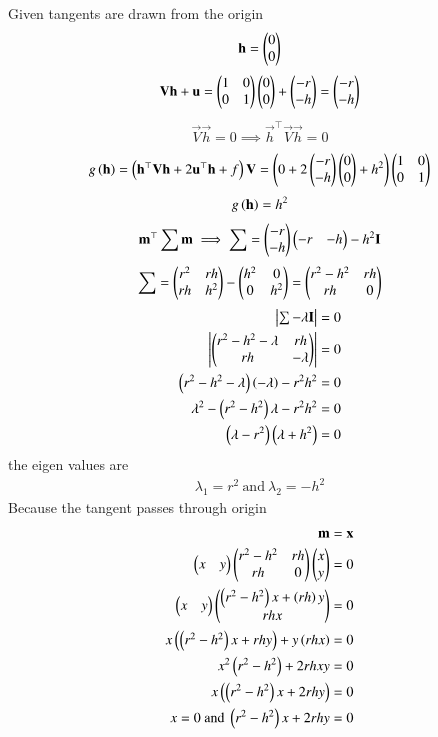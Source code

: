 \documentclass[journal]{IEEEtran}
\begin{document}
Given tangents are drawn from the origin
\begin{align}
    \mathbf{h}=\begin{pmatrix}0\\0\end{pmatrix}
\end{align}
\begin{align}
  \mathbf{V}\mathbf{h}+\mathbf{u}=\begin{pmatrix}1&0\\0&1\end{pmatrix}\begin{pmatrix}0\\0\end{pmatrix}+\begin{pmatrix}-r\\-h\end{pmatrix}=\begin{pmatrix}-r\\-h\end{pmatrix}
  \end{align}
  \begin{align}
   \vec{V}\vec{h}=0 \implies  \vec{h}^\top\vec{V}\vec{h}=0
   \end{align}
   \begin{align}
  g\left(\mathbf{h}\right)=\left(\mathbf{h}^{\top}\mathbf{V}\mathbf{h}+2\mathbf{u}^{\top}\mathbf{h} + f\right)\mathbf{V}=\left(0+2\begin{pmatrix}-r\\-h\end{pmatrix}\begin{pmatrix}0\\0\end{pmatrix}+h^2\right)\begin{pmatrix}1&0\\0&1\end{pmatrix}
\end{align}
\begin{align}
g\left(\mathbf{h}\right)=h^2
\end{align}
\begin{align}
\mathbf{m}^\top\sum\mathbf{m}\implies\sum=\begin{pmatrix}-r\\-h\end{pmatrix}\begin{pmatrix}-r&-h\end{pmatrix}-h^2\mathbf{I}
\end{align}
\begin{align}
\sum=\begin{pmatrix}r^2& rh \\rh &h^2\end{pmatrix}-\begin{pmatrix}h^2&0\\0&h^2\end{pmatrix}=\begin{pmatrix}r^2-h^2&rh\\rh&0\end{pmatrix}
\end{align}
\begin{align}
\begin{vmatrix}\sum-\lambda\mathbf{I}\end{vmatrix}=0\\
\begin{vmatrix}\begin{pmatrix}r^2-h^2-\lambda&rh\\rh&-\lambda\end{pmatrix}\end{vmatrix}=0\\
\left(r^2-h^2-\lambda\right)\left(-\lambda\right)-r^2h^2=0 \\
\lambda^2-\left(r^2-h^2\right)\lambda-r^2h^2=0\\
\left(\lambda-r^2\right)\left(\lambda+h^2\right)=0
\end{align}
the eigen values are
\begin{align}
    \lambda_1=r^2\ \text{and}\ \lambda_2=-h^2
\end{align}
 Because the tangent passes through  origin
 \begin{align}
     \mathbf{m}=\mathbf{x} \\
     \begin{pmatrix}x&y\end{pmatrix}\begin{pmatrix}r^2-h^2&rh\\rh&0\end{pmatrix}\begin{pmatrix}x\\y\end{pmatrix}=0 \\
     \begin{pmatrix}x&y\end{pmatrix}\begin{pmatrix}\left(r^2-h^2\right)x+\left(rh\right)y\\rhx\end{pmatrix}=0 \\
     x\begin{pmatrix}\left(r^2-h^2\right)x+rhy\end{pmatrix}+y\left(rhx\right)=0 \\
     x^2\left(r^2-h^2\right)+2rhxy=0 \\
     x\left(\left(r^2-h^2\right)x+2rhy\right)=0 \\
     x=0\ \text{and}\ \left(r^2-h^2\right)x+2rhy=0
 \end{align}
\end{document}
